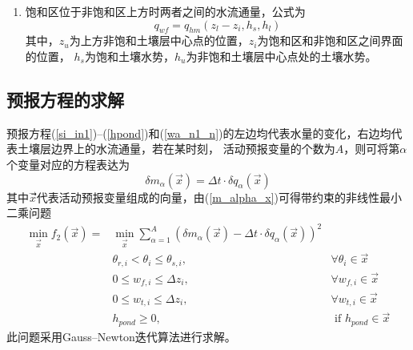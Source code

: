 \begin{enumerate}
    \item 饱和区位于非饱和区上方时两者之间的水流通量，公式为
    \begin{equation}
    q_{w f}=q_{h m}\left(z_{l}-z_{i}, h_{s}, h_{l}\right)
    \end{equation}
    其中，$z_u$为上方非饱和土壤层中心点的位置，$z_i$为饱和区和非饱和区之间界面的位置，
    $h_s$为饱和土壤水势，$h_u$为非饱和土壤层中心点处的土壤水势。
\end{enumerate}


\subsection{预报方程的求解}
预报方程(\ref{si_in1})--(\ref{hpond})和(\ref{wa_n1_n})的左边均代表水量的变化，右边均代表土壤层边界上的水流通量，若在某时刻，
活动预报变量的个数为$A$，则可将第$\alpha$个变量对应的方程表达为
\begin{equation}\label{m_alpha_x}
\delta m_{\alpha}(\vec{x})=\Delta t \cdot \delta q_{\alpha}(\vec{x})
\end{equation}
其中$\vec{x}$⃗代表活动预报变量组成的向量，由(\ref{m_alpha_x})可得带约束的非线性最小二乘问题
\begin{equation}
\begin{aligned}
\min _{\vec{x}} f_{2}(\vec{x})=& \min _{\vec{x}} \sum_{\alpha=1}^{A}\left(\delta m_{\alpha}(\vec{x})-\Delta t \cdot \delta q_{\alpha}(\vec{x})\right)^{2} \\ 
& \theta_{r, i}<\theta_{i} \leq \theta_{s, i}, & \forall \theta_{i} \in \vec{x} \\ 
& 0 \leq w_{f, i} \leq \Delta z_{i},               & \forall w_{f, i} \in \vec{x} \\ 
& 0 \leq w_{t, i} \leq \Delta z_{i},               & \forall w_{t, i} \in \vec{x} \\ 
& h_{ {pond }} \geq 0,                               & \text{ if } h_{ {pond }} \in \vec{x} 
\end{aligned}
\end{equation}
此问题采用Gauss--Newton迭代算法进行求解。